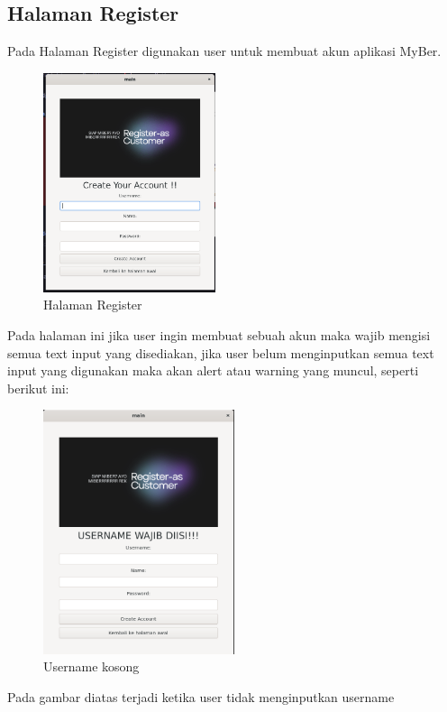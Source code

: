 \documentclass[a4paper,12pt]{article}
\begin{document}
\subsection{Halaman Register}
Pada Halaman Register digunakan user untuk membuat akun aplikasi MyBer.
\begin{figure}[!h]
    \centering
    \includegraphics[width=0.45\textwidth]{./img/create_user_screen.png}
    \caption{Halaman Register}
\end{figure}
\FloatBarrier
Pada halaman ini jika user ingin membuat sebuah akun maka wajib mengisi semua text input yang disediakan, jika user belum menginputkan semua text input yang digunakan maka akan alert atau warning yang muncul, seperti berikut ini:
\begin{figure}[!h]
    \centering
    \includegraphics[width=0.5\textwidth]{./img/username_kosong.png}
    \caption{Username kosong}
\end{figure}
\FloatBarrier
Pada gambar diatas terjadi ketika user tidak menginputkan username
\end{document}
